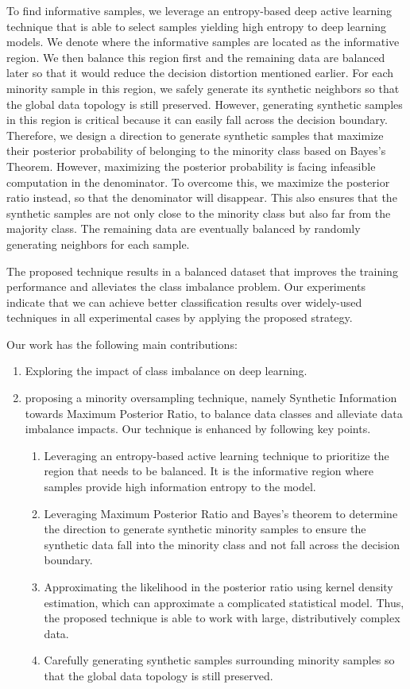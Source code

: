 \documentclass[final,5p,times, twocolumn]{elsarticle}
\newcommand{\MethodnameLong}{Synthetic Information towards Maximum Posterior Ratio}
\begin{document}
	To find informative samples, we leverage an entropy-based deep active learning technique that is able to select samples yielding high entropy to deep learning models. We denote where the informative samples are located as the informative region. We then balance this region first and the remaining data are balanced later so that it would reduce the decision distortion mentioned earlier. For each minority sample in this region, we safely generate its synthetic neighbors so that the global data topology is still preserved. However, generating synthetic samples in this region is critical because it can easily fall across the decision boundary. Therefore, we design a direction to generate synthetic samples that maximize their posterior probability of belonging to the minority class based on Bayes's Theorem. However, maximizing the posterior probability is facing infeasible computation in the denominator. To overcome this, we maximize the posterior ratio instead, so that the denominator will disappear. This also ensures that the synthetic samples are not only close to the minority class but also far from the majority class. The remaining data are eventually balanced by randomly generating neighbors for each sample. 
	
	The proposed technique results in a balanced dataset that improves the training performance and alleviates the class imbalance problem. Our experiments indicate that we can achieve better classification results over widely-used techniques in all experimental cases by applying the proposed strategy.  
	
	Our work has the following main contributions:
	\begin{enumerate}
		\item{Exploring the impact of class imbalance on deep learning.}
		\item{proposing a minority oversampling technique, namely \MethodnameLong, to balance data classes and alleviate data imbalance impacts. Our technique is enhanced by following key points.}
		\begin{enumerate}
			\item Leveraging an entropy-based active learning technique to prioritize the region that needs to be balanced. It is the informative region where samples provide high information entropy to the model. 
			\item Leveraging Maximum Posterior Ratio and Bayes's theorem to determine the direction to generate synthetic minority samples to ensure the synthetic data fall into the minority class and not fall across the decision boundary.
			\item Approximating the likelihood in the posterior ratio using kernel density estimation, which can approximate a complicated statistical model. Thus, the proposed technique is able to work with large, distributively complex data. 
			\item Carefully generating synthetic samples surrounding minority samples so that the global data topology is still preserved. 
		\end{enumerate}
	\end{enumerate}
	
\end{document}
